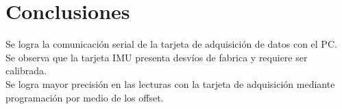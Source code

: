 \section{Conclusiones} \label{sec:conclusiones}

Se logra la comunicación serial de la tarjeta de adquisición de datos con el PC.\\

Se observa que la tarjeta IMU presenta desvíos de fabrica y requiere ser calibrada.\\

Se logra mayor precisión en las lecturas con la tarjeta de adquisición mediante programación por medio de los offset.
 
 

